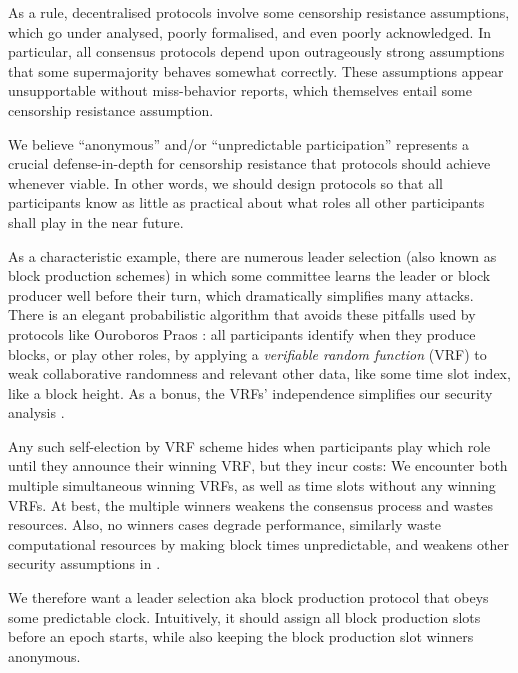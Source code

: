 

As a rule, decentralised protocols involve some censorship resistance assumptions, which go under analysed, poorly formalised, and even poorly acknowledged.  In particular, all consensus protocols depend upon outrageously strong assumptions that some supermajority behaves somewhat correctly.  These assumptions appear unsupportable without miss-behavior reports, which themselves entail some censorship resistance assumption. 

We believe ``anonymous'' and/or ``unpredictable participation'' represents a crucial defense-in-depth for censorship resistance that protocols should achieve whenever viable.  In other words, we should design protocols so that all participants know as little as practical about what roles all other participants shall play in the near future. 

As a characteristic example, there are numerous leader selection (also known as block production schemes) in which some committee learns the leader or block producer well before their turn, which dramatically simplifies many attacks.  There is an elegant probabilistic algorithm that avoids these pitfalls used by protocols like Ouroboros Praos \cite{Praos}:  all participants identify when they produce blocks, or play other roles, by applying a {\em verifiable random function} (VRF) to weak collaborative randomness and relevant other data, like some time slot index, like a block height.  As a bonus, the VRFs' independence simplifies our security analysis \cite{Kiffer18}.

Any such self-election by VRF scheme hides when participants play which role until they announce their winning VRF, but they incur costs:  We encounter both multiple simultaneous winning VRFs, as well as time slots without any winning VRFs.  At best, the multiple winners weakens the consensus process and wastes resources.  Also, no winners cases degrade performance, similarly waste computational resources by making block times unpredictable, and weakens other security assumptions in \cite{Praos,Kiffer18}.

We therefore want a leader selection aka block production protocol that obeys some predictable clock.  Intuitively, it should assign all block production slots before an epoch starts, while also keeping the block production slot winners anonymous.  

